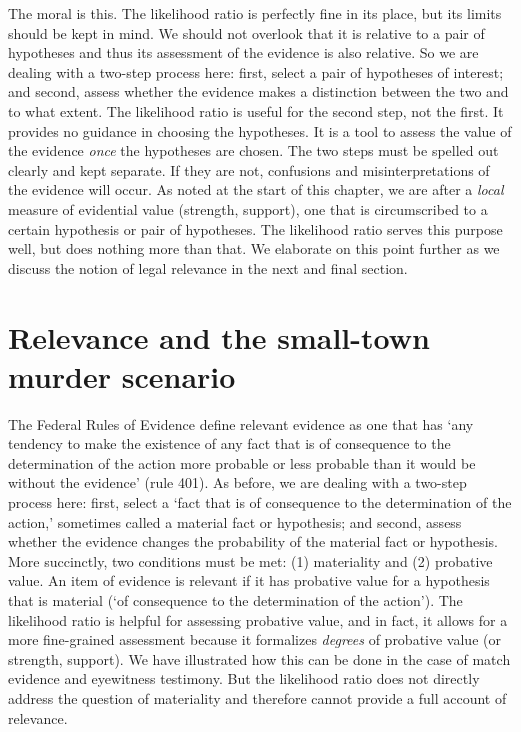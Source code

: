 \documentclass[
  10pt,
  dvipsnames,enabledeprecatedfontcommands]{scrartcl}
\begin{document}
The moral is this. The likelihood ratio is perfectly fine in its place,
but its limits should be kept in mind. We should not overlook that it is
relative to a pair of hypotheses and thus its assessment of the evidence
is also relative. So we are dealing with a two-step process here: first,
select a pair of hypotheses of interest; and second, assess whether the
evidence makes a distinction between the two and to what extent. The
likelihood ratio is useful for the second step, not the first. It
provides no guidance in choosing the hypotheses. It is a tool to assess
the value of the evidence \textit{once} the hypotheses are chosen. The
two steps must be spelled out clearly and kept separate. If they are
not, confusions and misinterpretations of the evidence will occur. As
noted at the start of this chapter, we are after a \textit{local}
measure of evidential value (strength, support), one that is
circumscribed to a certain hypothesis or pair of hypotheses. The
likelihood ratio serves this purpose well, but does nothing more than
that. We elaborate on this point further as we discuss the notion of
legal relevance in the next and final section.

\hypertarget{relevance-and-the-small-town-murder-scenario}{%
\section{\texorpdfstring{Relevance and the small-town murder scenario
\label{sec:relevance}}{Relevance and the small-town murder scenario }}\label{relevance-and-the-small-town-murder-scenario}}

The Federal Rules of Evidence define relevant evidence as one that has
`any tendency to make the existence of any fact that is of consequence
to the determination of the action more probable or less probable than
it would be without the evidence' (rule 401). As before, we are dealing
with a two-step process here: first, select a `fact that is of
consequence to the determination of the action,' sometimes called a
material fact or hypothesis; and second, assess whether the evidence
changes the probability of the material fact or hypothesis. More
succinctly, two conditions must be met: (1) materiality and (2)
probative value. An item of evidence is relevant if it has probative
value for a hypothesis that is material (`of consequence to the
determination of the action'). The likelihood ratio is helpful for
assessing probative value, and in fact, it allows for a more
fine-grained assessment because it formalizes \textit{degrees} of
probative value (or strength, support). We have illustrated how this can
be done in the case of match evidence and eyewitness testimony. But the
likelihood ratio does not directly address the question of materiality
and therefore cannot provide a full account of relevance.
\end{document}
